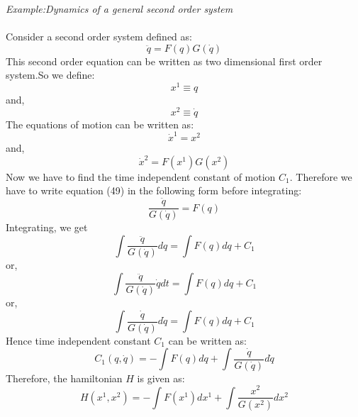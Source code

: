 \documentclass[14pt]{extarticle}
\begin{document}
\textit{Example:Dynamics of a general second order system} \\ \\
Consider a second order system defined as:\\
\begin{equation}
\ddot{q}=F(q) G(\dot{q})
\end{equation}
This second order equation can be written as two dimensional first order system.So we define:\\
\begin{equation}
x^{1} \equiv q
\end{equation}
and,\\
\begin{equation}
x^{2} \equiv \dot{q}
\end{equation}
The equations of motion can be written as:\\
\begin{equation}
\dot{x}^{1}=x^{2}
\end{equation}
and,
\begin{equation}
\dot{x}^{2}=F\left(x^{1}\right) G\left(x^{2}\right)
\end{equation}
Now we have to find the time independent constant of motion $C_{1}$. Therefore we have to write equation (49) in the following form before integrating: \\
\begin{equation}
\frac{\ddot{q}}{G(\dot{q})}=F(q) 
\end{equation}
Integrating, we get\\
\begin{equation}
\int\frac{\ddot{q}}{G(\dot{q})}dq = \int F(q) d q + C_{1}
\end{equation}
or,\\
\begin{equation}
\int\frac{\ddot{q}}{G(\dot{q})}\dot{q}dt = \int F(q) d q + C_{1}
\end{equation}
or,\\
\begin{equation}
\int\frac{\dot{q}}{G(\dot{q})}d\dot{q} = \int F(q) d q + C_{1}
\end{equation}
Hence time independent constant $C_{1}$ can be written as:\\
\begin{equation}
C_{1}(q, \dot{q})=-\int F(q) d q+\int \frac{\dot{q}}{G(\dot{q})} d \dot{q}
\end{equation}
Therefore, the hamiltonian $H$ is given as:\\
\begin{equation}
H\left(x^{1}, x^{2}\right)=-\int F\left(x^{1}\right) d x^{1}+\int \frac{x^{2}}{G\left(x^{2}\right)} d x^{2}
\end{equation}
\end{document}

